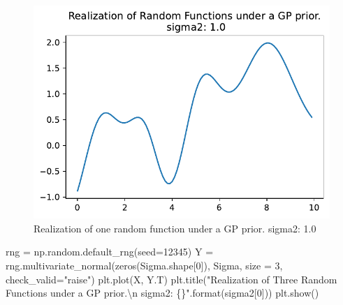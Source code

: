 \documentclass[
  letterpaper,
  DIV=11,
  numbers=noendperiod]{scrreprt}
\newenvironment{Shaded}{\begin{snugshade}}{\end{snugshade}}
\newcommand{\BuiltInTok}[1]{\textcolor[rgb]{0.00,0.23,0.31}{#1}}
\newcommand{\CharTok}[1]{\textcolor[rgb]{0.13,0.47,0.30}{#1}}
\newcommand{\DecValTok}[1]{\textcolor[rgb]{0.68,0.00,0.00}{#1}}
\newcommand{\NormalTok}[1]{\textcolor[rgb]{0.00,0.23,0.31}{#1}}
\newcommand{\OperatorTok}[1]{\textcolor[rgb]{0.37,0.37,0.37}{#1}}
\newcommand{\SpecialCharTok}[1]{\textcolor[rgb]{0.37,0.37,0.37}{#1}}
\newcommand{\StringTok}[1]{\textcolor[rgb]{0.13,0.47,0.30}{#1}}
\begin{document}
\begin{figure}[H]

{\centering \includegraphics{006_num_gp_files/figure-pdf/fig-mvn1-1-output-1.pdf}

}

\caption{\label{fig-mvn1-1}Realization of one random function under a GP
prior. sigma2: 1.0}

\end{figure}

\begin{Shaded}
\begin{Highlighting}[]
\NormalTok{rng }\OperatorTok{=}\NormalTok{ np.random.default\_rng(seed}\OperatorTok{=}\DecValTok{12345}\NormalTok{)}
\NormalTok{Y }\OperatorTok{=}\NormalTok{ rng.multivariate\_normal(zeros(Sigma.shape[}\DecValTok{0}\NormalTok{]), Sigma, size }\OperatorTok{=} \DecValTok{3}\NormalTok{, check\_valid}\OperatorTok{=}\StringTok{"raise"}\NormalTok{)}
\NormalTok{plt.plot(X, Y.T)}
\NormalTok{plt.title(}\StringTok{"Realization of Three Random Functions under a GP prior.}\CharTok{\textbackslash{}n}\StringTok{ sigma2: }\SpecialCharTok{\{\}}\StringTok{"}\NormalTok{.}\BuiltInTok{format}\NormalTok{(sigma2[}\DecValTok{0}\NormalTok{]))}
\NormalTok{plt.show()}
\end{Highlighting}
\end{Shaded}
\end{document}
